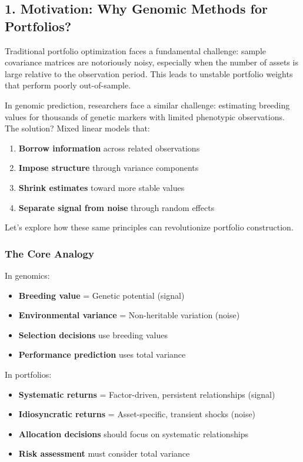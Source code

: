 \documentclass[
]{article}
\providecommand{\tightlist}{%
  \setlength{\itemsep}{0pt}\setlength{\parskip}{0pt}}
\begin{document}
\subsection{1. Motivation: Why Genomic Methods for
Portfolios?}\label{motivation}

Traditional portfolio optimization faces a fundamental challenge: sample
covariance matrices are notoriously noisy, especially when the number of
assets is large relative to the observation period. This leads to
unstable portfolio weights that perform poorly out-of-sample.

In genomic prediction, researchers face a similar challenge: estimating
breeding values for thousands of genetic markers with limited phenotypic
observations. The solution? Mixed linear models that:

\begin{enumerate}
\def\labelenumi{\arabic{enumi}.}
\tightlist
\item
  \textbf{Borrow information} across related observations
\item
  \textbf{Impose structure} through variance components
\item
  \textbf{Shrink estimates} toward more stable values
\item
  \textbf{Separate signal from noise} through random effects
\end{enumerate}

Let's explore how these same principles can revolutionize portfolio
construction.

\subsubsection{The Core Analogy}\label{the-core-analogy}

In genomics:

\begin{itemize}
\tightlist
\item
  \textbf{Breeding value} = Genetic potential (signal)
\item
  \textbf{Environmental variance} = Non-heritable variation (noise)
\item
  \textbf{Selection decisions} use breeding values
\item
  \textbf{Performance prediction} uses total variance
\end{itemize}

In portfolios:

\begin{itemize}
\tightlist
\item
  \textbf{Systematic returns} = Factor-driven, persistent relationships
  (signal)
\item
  \textbf{Idiosyncratic returns} = Asset-specific, transient shocks
  (noise)
\item
  \textbf{Allocation decisions} should focus on systematic relationships
\item
  \textbf{Risk assessment} must consider total variance
\end{itemize}
\end{document}

